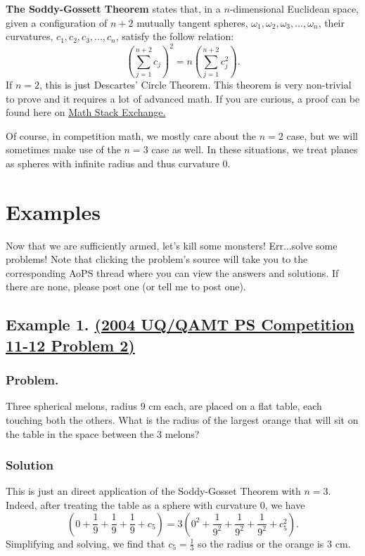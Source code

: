 \documentclass{article}
\begin{document}
\textbf{The Soddy-Gossett Theorem} states that, in a $n$-dimensional Euclidean space, given a configuration of $n+2$ mutually tangent spheres, $\omega_1,\omega_2,\omega_3,...,\omega_n$, their curvatures, $c_1,c_2,c_3,...,c_n$, satisfy the follow relation: $$\left(\sum_{j=1}^{n+2} c_j\right)^2=n\left(\sum_{j=1}^{n+2} c_j^2\right).$$ If $n=2$, this is just Descartes' Circle Theorem. This theorem is very non-trivial to prove and it requires a lot of advanced math. If you are curious, a proof can be found here on \href{https://math.stackexchange.com/questions/881777/proof-of-descartes-theorem}{Math Stack Exchange.}



Of course, in competition math, we mostly care about the $n=2$ case, but we will sometimes make use of the $n=3$ case as well. In these situations, we treat planes as spheres with infinite radius and thus curvature $0$. 
\section{Examples}
Now that we are sufficiently armed, let's kill some monsters! Err...solve some problems! Note that clicking the problem's source will take you to the corresponding AoPS thread where you can view the answers and solutions. If there are none, please post one (or tell me to post one). 

\subsection{Example 1. \href{https://artofproblemsolving.com/community/c4h2422437}{(2004 UQ/QAMT PS Competition 11-12 Problem 2)}}
\subsubsection{Problem.}
Three spherical melons, radius $9$ cm each, are placed on a flat table, each touching both the others. What is the radius of the largest orange that will sit on the table in the space between the $3$ melons? 
\subsubsection{Solution}
This is just an direct application of the Soddy-Gosset Theorem with $n=3$. Indeed, after treating the table as a sphere with curvature $0$, we have $$\left(0+\frac19+\frac19+\frac19+c_5  \right)=3\left(0^2+\frac{1}{9^2}+\frac{1}{9^2}+\frac{1}{9^2}+c_5^2 \right).$$ Simplifying and solving, we find that $c_5=\frac13$ so the radius or the orange is $3$ cm. 
\end{document}
